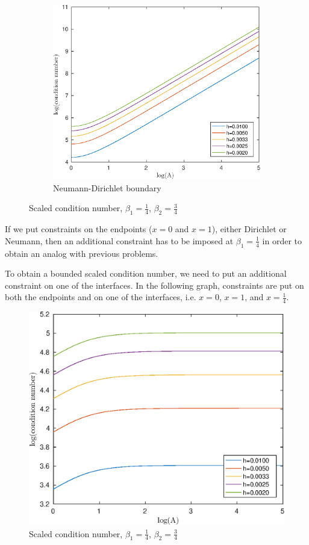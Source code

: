 \documentclass[12pt]{article}
\begin{document}
\begin{figure}[h!]
\begin{subfigure}{0.4\textwidth}
\includegraphics[width=\textwidth]{cond-A-42-ND}
\caption{Neumann-Dirichlet boundary}
\end{subfigure}
\caption{Scaled condition number, $\beta_{1}=\frac{1}{4}$, $\beta_{2}=\frac{3}{4}$}
\end{figure}
\pagebreak
If we put constraints on the endpoints ($x=0$ and $x=1$), either Dirichlet or Neumann, then an additional constraint has to be imposed at $\beta_{1}=\frac{1}{4}$ in order to obtain an analog with previous problems. 

To obtain a bounded scaled condition number, we need to put an additional constraint on one of the interfaces. In the following graph, constraints are put on both the endpoints and on one of the interfaces, i.e. $x=0$, $x=1$, and $x=\frac{1}{4}$.
\pagebreak
\begin{figure}[h!]
\centering
\includegraphics[scale=0.7]{cond-A-42-NN}
\caption{Scaled condition number, $\beta_{1}=\frac{1}{4}$, $\beta_{2}=\frac{3}{4}$}
\end{figure}
\end{document}
